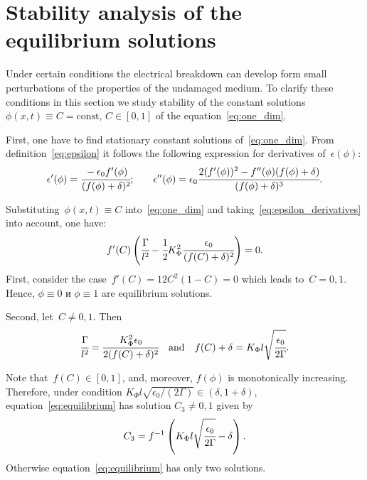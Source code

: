 
\section{Stability analysis of the equilibrium solutions}
\label{sec:theoretical_analysis}

Under certain conditions the electrical breakdown can develop
form small perturbations of the properties of the undamaged medium.
To clarify these conditions in this section we study
stability of the constant solutions~$\phi(x, t) \equiv C = \text{const}$, $C \in [0, 1]$
of the equation~\eqref{eq:one_dim}.

First, one have to find stationary constant solutions of~\eqref{eq:one_dim}.
From definition~\eqref{eq:epsilon} it follows the following expression for derivatives
of~$\epsilon(\phi)$:
\begin{equation}
	\epsilon'(\phi) = \cfrac{-\epsilon_0 f'(\phi)}{(f(\phi) + \delta)^2} {\text{;}} \qquad \epsilon''(\phi) = \epsilon_0 \cfrac{2 (f'(\phi))^2 - f''(\phi)(f(\phi) + \delta)}{(f(\phi) + \delta)^3} {\text{.}}
	\label{eq:epsilon_derivatives}
\end{equation}

Substituting~$\phi(x, t) \equiv C$ into~\eqref{eq:one_dim} and
taking~\eqref{eq:epsilon_derivatives} into account, one have:
\begin{equation}
	f'(C) \left( \cfrac{\Gamma}{l^2} - \cfrac{1}{2} K_\Phi^2 \cfrac{\epsilon_0}{(f(C) + \delta)^2} \right) = 0 {\text{.}}
	\label{eq:equilibrium}
\end{equation}
First, consider the case~$f'(C) = 12C^2 (1 - C) = 0$
which leads to~$C = 0,1$. Hence, $\phi \equiv 0$ и $\phi \equiv 1$ are
equilibrium solutions.

Second, let~$C \neq 0, 1$. Then
\[
\cfrac{\Gamma}{l^2} = \cfrac{K_\Phi^2 \epsilon_0}{2 (f(C) + \delta)^2}
\quad \text{and} \quad
f(C) + \delta = K_\Phi l \sqrt{\cfrac{\epsilon_0}{2 \Gamma}}.
\]

Note that~$f(C) \in [0, 1]$, and, moreover, $f(\phi)$ is monotonically
increasing. Therefore, under condition $K_\Phi l \sqrt{\epsilon_0 / (2
  \Gamma)} \in (\delta, 1 + \delta)$,
equation~\eqref{eq:equilibrium} has solution $C_3\ne 0,1$ given by
\begin{equation}
	C_3 = f^{-1} \left( K_\Phi l \sqrt{\cfrac{\epsilon_0}{2 \Gamma}} - \delta \right) {\text{.}}
	\label{eq:equilibrium_third}
\end{equation}
Otherwise equation~\eqref{eq:equilibrium} has only two solutions.

